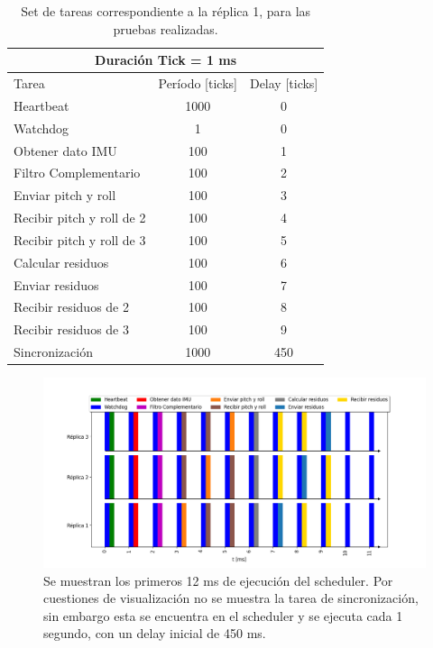 \begin{table}[H]
    \centering
    \begin{tabular}{|l|c|c|}
        \hline
        \multicolumn{3}{|c|}{Duración Tick = 1 ms}\\
        \hline
        Tarea & Período [ticks] & Delay [ticks]\\
        \hline
        Heartbeat                 & 1000 & 0 \\
        Watchdog                  & 1    & 0 \\ 
        Obtener dato IMU          & 100  & 1 \\
        Filtro Complementario     & 100  & 2 \\
        Enviar pitch y roll       & 100  & 3 \\
        Recibir pitch y roll de 2 & 100  & 4 \\
        Recibir pitch y roll de 3 & 100  & 5 \\
        Calcular residuos         & 100  & 6 \\
        Enviar residuos           & 100  & 7 \\
        Recibir residuos de 2     & 100  & 8 \\
        Recibir residuos de 3     & 100  & 9 \\
        Sincronización            & 1000 & 450 \\
        \hline
    \end{tabular}
    \caption{Set de tareas correspondiente a la réplica 1, para las pruebas realizadas.}
    \label{tab:schedule_pruebas_realizadas}
\end{table}

\begin{figure}[H]
    \centering
    \includegraphics[width=\textwidth]{img/grafico_hyperperiod_pruebas_realizadas.png}
    \caption{Se muestran los primeros 12 ms de ejecución del scheduler. Por cuestiones de visualización no se muestra la tarea de sincronización, sin embargo esta se encuentra en el scheduler y se ejecuta cada 1 segundo, con un delay inicial de 450 ms.}
    \label{fig:grafico_hyperperiod_pruebas_realizadas}
\end{figure}

